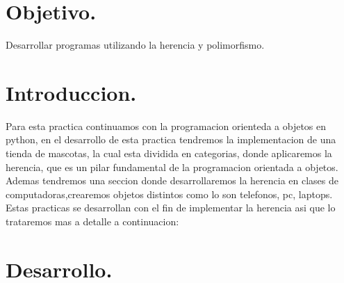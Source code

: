 \documentclass[12pt]{article}
\begin{document}
\newpage																		

\tableofcontents 

\newpage

\section{Objetivo.}

Desarrollar programas utilizando la herencia y polimorfismo.

\section{Introduccion.} 
Para esta practica continuamos con la programacion orienteda a objetos en python, en el desarrollo de esta practica tendremos la implementacion de una tienda de mascotas, la cual esta dividida en categorias, donde aplicaremos la herencia, que es un pilar fundamental de la programacion orientada a objetos. Ademas tendremos una seccion donde desarrollaremos la herencia en clases de computadoras,crearemos objetos distintos como lo son telefonos, pc, laptops.\\
Estas practicas se desarrollan con el fin de implementar la herencia asi que lo trataremos mas a detalle a continuacion:\\


\section{Desarrollo.}
\end{document}
